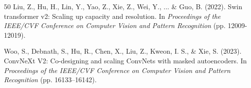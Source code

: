 \documentclass[pdflatex,sn-mathphys-num]{sn-jnl}
\theoremstyle{thmstyleone}%
\theoremstyle{thmstyletwo}%
\theoremstyle{thmstylethree}%
\begin{document}
\begin{thebibliography}{50}
 Liu, Z., Hu, H., Lin, Y., Yao, Z., Xie, Z., Wei, Y., ... \& Guo, B. (2022). Swin transformer v2: Scaling up capacity and resolution. In \textit{Proceedings of the IEEE/CVF Conference on Computer Vision and Pattern Recognition} (pp. 12009-12019).

 Woo, S., Debnath, S., Hu, R., Chen, X., Liu, Z., Kweon, I. S., \& Xie, S. (2023). ConvNeXt V2: Co-designing and scaling ConvNets with masked autoencoders. In \textit{Proceedings of the IEEE/CVF Conference on Computer Vision and Pattern Recognition} (pp. 16133--16142).

\end{thebibliography}
\end{document}
